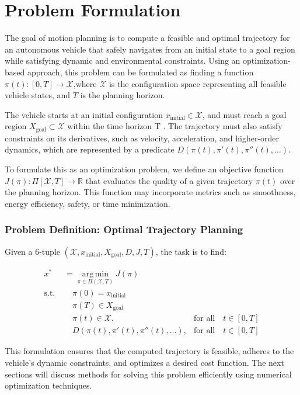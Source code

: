 \section{Problem Formulation} \label{sec:problem_formulation}

The goal of motion planning is to compute a feasible and optimal trajectory for an autonomous vehicle that safely navigates from an initial state to
a goal region while satisfying dynamic and environmental constraints.
Using an optimization-based approach, this problem can be formulated as finding a function $\pi(t): [0,T] \to \mathcal{X}$,where $\mathcal{X}$ is the
configuration space representing all feasible vehicle states, and $T$ is the planning horizon.

The vehicle starts at an initial configuration $x_{\text{initial}} \in \mathcal{X}$, and must reach a goal region $X_{\text{goal}} \subset
	\mathcal{X}$ within the time horizon T .
The trajectory must also satisfy constraints on its derivatives, such as velocity, acceleration, and higher-order dynamics, which are represented by
a predicate $D(\pi(t), \pi'(t), \pi''(t), \dots)$.

To formulate this as an optimization problem, we define an objective function $J(\pi): \Pi[\mathcal{X}, T] \to \mathbb{R}$ that evaluates the quality
of a given trajectory $\pi(t)$ over the planning horizon.
This function may incorporate metrics such as smoothness, energy efficiency, safety, or time minimization.

\subsubsection{Problem Definition: Optimal Trajectory Planning} \label{subsec:optimal_trajectory_planning}

Given a 6-tuple $(\mathcal{X}, x_{\text{initial}}, X_{\text{goal}}, D, J, T)$, the task is to find:

\begin{align}
	x^* & = \underset{\pi \in \Pi(\mathcal{X},T)}{\operatorname{arg\,min}}
	J(\pi)                                                                                                                        \\ \text{s.t.
	}   & \quad \pi(0) = x_{\text{initial}}                                                                                       \\
	    & \quad \pi(T) \in X_{\text{goal}}                                                                                        \\
	    & \quad \pi(t) \in \mathcal{X},                                    & \text{for all} \quad t \in [0,T]                     \\
	    & \quad D(\pi(t), \pi'(t), \pi''(t), \dots),                       & \text{for all} \quad t \in [0,T] \label{eq:dynamics}
\end{align}

This formulation ensures that the computed trajectory is feasible, adheres to the vehicle's dynamic constraints, and optimizes a desired cost
function.
The next sections will discuss methods for solving this problem efficiently using numerical optimization techniques.
